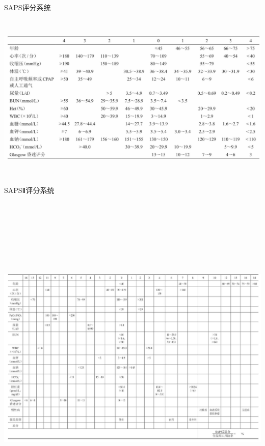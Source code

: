 \begin{table}[htbp]
\centering
\caption{SAPS评分系统}
\label{tab147-7}
\includegraphics[width=6.58333in,height=3.19792in]{./images/Image00543.jpg}
\end{table}

\begin{table}[htbp]
\centering
\caption{SAPSⅡ评分系统}
\label{tab147-8}
\includegraphics[width=9.72917in,height=6.36458in]{./images/Image00544.jpg}
\end{table}

